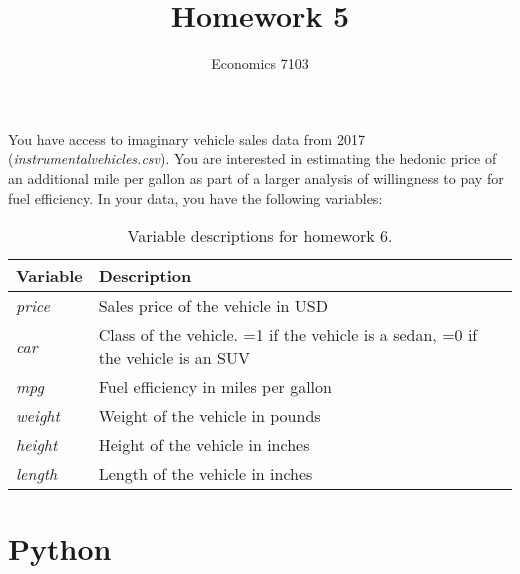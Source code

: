 \documentclass{article}
\title{Homework 5}
\author{Economics 7103}
\date{ }
\begin{document}
\maketitle

\noindent You have access to imaginary vehicle sales data from 2017 (\textit{instrumentalvehicles.csv}).  You are interested in estimating the hedonic price of an additional mile per gallon as part of a larger analysis of willingness to pay for fuel efficiency.  In your data, you have the following variables:
\begin{table}[h]
    \centering
    \begin{tabular}{l|l}
        Variable & Description \\ \hline
         \textit{price} & Sales price of the vehicle in USD  \\
         \textit{car} & Class of the vehicle. =1 if the vehicle is a sedan, =0 if the vehicle is an SUV \\
         \textit{mpg} & Fuel efficiency in miles per gallon \\
         \textit{weight} & Weight of the vehicle in pounds \\
         \textit{height} & Height of the vehicle in inches \\
         \textit{length} & Length of the vehicle in inches \\
    \end{tabular}
    \caption{Variable descriptions for homework 6.}
    \label{tab:variables6}
\end{table}

\section{Python}
\end{document}
